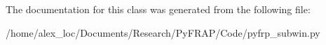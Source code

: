 The documentation for this class was generated from the following file\+:\begin{DoxyCompactItemize}
\item 
/home/alex\+\_\+loc/\+Documents/\+Research/\+Py\+F\+R\+A\+P/\+Code/pyfrp\+\_\+subwin.\+py\end{DoxyCompactItemize}
